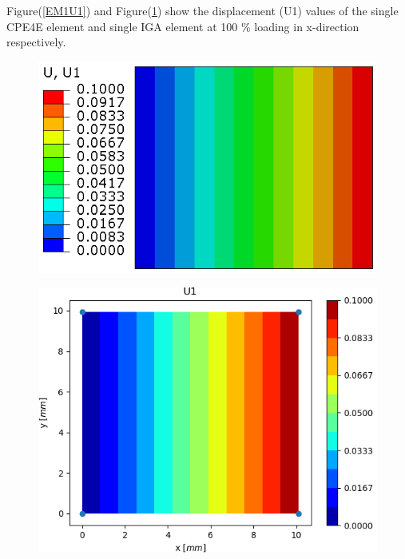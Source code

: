 \documentclass[11pt]{article}
\begin{document}
Figure(\ref{EM1U1}) and Figure(\ref{EM1U1_IGA}) show the displacement (U1) values of the single CPE4E element and single IGA element at 100 \% loading in x-direction respectively. \\
\begin{figure}[H]
	\centering
	\begin{minipage}{.5\textwidth}
		\centering
		\includegraphics[width=1\linewidth]{EM1U1.png}
		\label{EM1U1}
	\end{minipage}%
	\begin{minipage}{.5\textwidth}
		\centering
		\includegraphics[width=1\linewidth]{EM1U1_IGA.png}
		\label{EM1U1_IGA}
	\end{minipage}
\end{figure}
\end{document}
